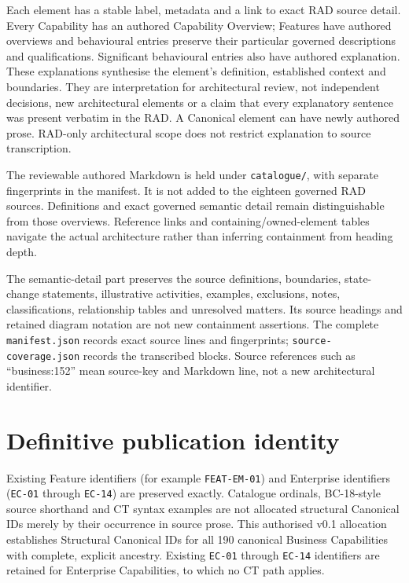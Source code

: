 Each element has a stable label, metadata and a link to exact RAD source detail.
Every Capability has an authored Capability Overview; Features have authored
overviews and behavioural entries preserve their particular governed descriptions
and qualifications. Significant behavioural entries also have authored explanation.
These explanations synthesise the element's definition, established context and
boundaries. They are interpretation for architectural review, not independent
decisions, new architectural elements or a claim that every explanatory sentence
was present verbatim in the RAD. A Canonical element can have newly authored prose.
RAD-only architectural scope does not restrict explanation to source transcription.

The reviewable authored Markdown is held under \texttt{catalogue/}, with separate
fingerprints in the manifest. It is not added to the eighteen governed RAD sources.
Definitions and exact governed semantic detail remain distinguishable from those
overviews. Reference links and containing/owned-element tables navigate the actual
architecture rather than inferring containment from heading depth.

The semantic-detail part preserves the source definitions, boundaries, state-change
statements, illustrative activities, examples, exclusions, notes, classifications,
relationship tables and unresolved matters. Its source headings and retained diagram
notation are not new containment assertions. The complete \texttt{manifest.json}
records exact source lines and fingerprints; \texttt{source-coverage.json} records the
transcribed blocks. Source references such as ``business:152'' mean source-key and
Markdown line, not a new architectural identifier.

\section{Definitive publication identity}

Existing Feature identifiers (for example \texttt{FEAT-EM-01}) and Enterprise
identifiers (\texttt{EC-01} through \texttt{EC-14}) are preserved exactly.
Catalogue ordinals, BC-18-style source shorthand and CT syntax examples are not
allocated structural Canonical IDs merely by their occurrence in source prose.
This authorised v0.1 allocation establishes Structural Canonical IDs for all 190
canonical Business Capabilities with complete, explicit ancestry. Existing
\texttt{EC-01} through \texttt{EC-14} identifiers are retained for Enterprise
Capabilities, to which no CT path applies.

